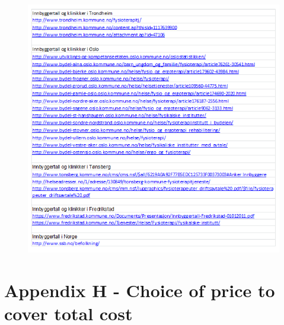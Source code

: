 \begin{figure}
\begin{center}
\includegraphics[scale=0.8]{kilder}
\label{fig:sources}
\end{center}
\end{figure}

\newpage
\section*{Appendix H - Choice of price to cover total cost}
\label{H}

